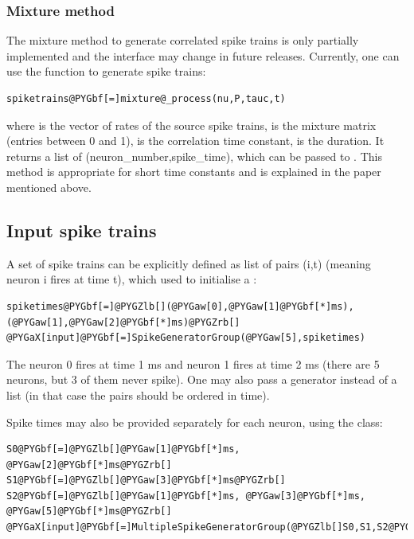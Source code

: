 \documentclass[letterpaper,10pt,english]{manual}
\begin{document}
\subsubsection{Mixture method}

The mixture method to generate correlated spike trains is only partially implemented and the
interface may change in future releases. Currently, one can use the function
 to generate spike trains:

\begin{Verbatim}[commandchars=@\[\]]
spiketrains@PYGbf[=]mixture@_process(nu,P,tauc,t)
\end{Verbatim}

where  is the vector of rates of the source spike trains,
 is the mixture matrix (entries between 0 and 1),
 is the correlation time constant,
 is the duration. It returns a list of
(neuron\_number,spike\_time), which can be passed to
. This method is appropriate for short time constants and is explained
in the paper mentioned above.


\subsection{Input spike trains}

A set of spike trains can be explicitly defined as list of pairs (i,t)
(meaning neuron i fires at time t), which used to initialise a
\hyperlink{brian.SpikeGeneratorGroup}{}:

\begin{Verbatim}[commandchars=@\[\]]
spiketimes@PYGbf[=]@PYGZlb[](@PYGaw[0],@PYGaw[1]@PYGbf[*]ms), (@PYGaw[1],@PYGaw[2]@PYGbf[*]ms)@PYGZrb[]
@PYGaX[input]@PYGbf[=]SpikeGeneratorGroup(@PYGaw[5],spiketimes)
\end{Verbatim}

The neuron 0 fires at time 1 ms and neuron 1 fires at time 2 ms (there are 5 neurons,
but 3 of them never spike).
One may also pass a generator instead of a list (in that case the pairs should be
ordered in time).

Spike times may also be provided separately for each neuron, using the
\hyperlink{brian.MultipleSpikeGeneratorGroup}{} class:

\begin{Verbatim}[commandchars=@\[\]]
S0@PYGbf[=]@PYGZlb[]@PYGaw[1]@PYGbf[*]ms, @PYGaw[2]@PYGbf[*]ms@PYGZrb[]
S1@PYGbf[=]@PYGZlb[]@PYGaw[3]@PYGbf[*]ms@PYGZrb[]
S2@PYGbf[=]@PYGZlb[]@PYGaw[1]@PYGbf[*]ms, @PYGaw[3]@PYGbf[*]ms, @PYGaw[5]@PYGbf[*]ms@PYGZrb[]
@PYGaX[input]@PYGbf[=]MultipleSpikeGeneratorGroup(@PYGZlb[]S0,S1,S2@PYGZrb[])
\end{Verbatim}
\end{document}

